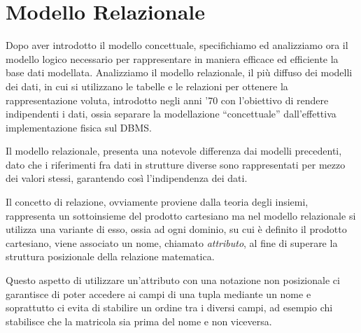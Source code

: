 \documentclass[a4paper,12pt, oneside]{book}
\begin{document}
\chapter{Modello Relazionale}
Dopo aver introdotto il modello concettuale, specifichiamo ed analizziamo ora il modello logico necessario per
rappresentare in maniera efficace ed efficiente la base dati modellata.\newline
Analizziamo il modello relazionale, il più diffuso dei modelli dei dati, in cui si utilizzano le tabelle e le relazioni
per ottenere la rappresentazione voluta, introdotto negli anni '70 con l'obiettivo di rendere indipendenti i dati,
ossia separare la modellazione ``concettuale'' dall'effettiva implementazione fisica sul DBMS.

Il modello relazionale, presenta una notevole differenza dai modelli precedenti, dato che i riferimenti
fra dati in strutture diverse sono rappresentati per mezzo dei valori stessi, garantendo così l'indipendenza dei dati.

Il concetto di relazione, ovviamente proviene dalla teoria degli insiemi, rappresenta un sottoinsieme
del prodotto cartesiano ma nel modello relazionale si utilizza una variante di esso, ossia ad ogni dominio,
su cui è definito il prodotto cartesiano, viene associato un nome, chiamato \emph{attributo},
al fine di superare la struttura posizionale della relazione matematica.

Questo aspetto di utilizzare un'attributo con una notazione non posizionale ci garantisce di poter 
accedere ai campi di una tupla mediante un nome e soprattutto ci evita di stabilire un ordine tra 
i diversi campi, ad esempio chi stabilisce che la matricola sia prima del nome e non viceversa.
\end{document}
